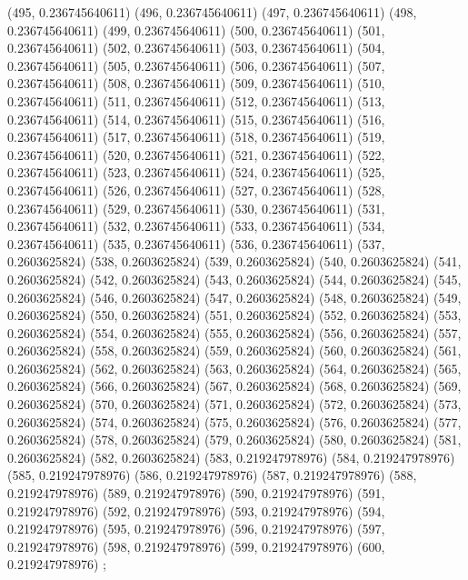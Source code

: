 {					(495, 0.236745640611)
					(496, 0.236745640611)
					(497, 0.236745640611)
					(498, 0.236745640611)
					(499, 0.236745640611)
					(500, 0.236745640611)
					(501, 0.236745640611)
					(502, 0.236745640611)
					(503, 0.236745640611)
					(504, 0.236745640611)
					(505, 0.236745640611)
					(506, 0.236745640611)
					(507, 0.236745640611)
					(508, 0.236745640611)
					(509, 0.236745640611)
					(510, 0.236745640611)
					(511, 0.236745640611)
					(512, 0.236745640611)
					(513, 0.236745640611)
					(514, 0.236745640611)
					(515, 0.236745640611)
					(516, 0.236745640611)
					(517, 0.236745640611)
					(518, 0.236745640611)
					(519, 0.236745640611)
					(520, 0.236745640611)
					(521, 0.236745640611)
					(522, 0.236745640611)
					(523, 0.236745640611)
					(524, 0.236745640611)
					(525, 0.236745640611)
					(526, 0.236745640611)
					(527, 0.236745640611)
					(528, 0.236745640611)
					(529, 0.236745640611)
					(530, 0.236745640611)
					(531, 0.236745640611)
					(532, 0.236745640611)
					(533, 0.236745640611)
					(534, 0.236745640611)
					(535, 0.236745640611)
					(536, 0.236745640611)
					(537, 0.2603625824)
					(538, 0.2603625824)
					(539, 0.2603625824)
					(540, 0.2603625824)
					(541, 0.2603625824)
					(542, 0.2603625824)
					(543, 0.2603625824)
					(544, 0.2603625824)
					(545, 0.2603625824)
					(546, 0.2603625824)
					(547, 0.2603625824)
					(548, 0.2603625824)
					(549, 0.2603625824)
					(550, 0.2603625824)
					(551, 0.2603625824)
					(552, 0.2603625824)
					(553, 0.2603625824)
					(554, 0.2603625824)
					(555, 0.2603625824)
					(556, 0.2603625824)
					(557, 0.2603625824)
					(558, 0.2603625824)
					(559, 0.2603625824)
					(560, 0.2603625824)
					(561, 0.2603625824)
					(562, 0.2603625824)
					(563, 0.2603625824)
					(564, 0.2603625824)
					(565, 0.2603625824)
					(566, 0.2603625824)
					(567, 0.2603625824)
					(568, 0.2603625824)
					(569, 0.2603625824)
					(570, 0.2603625824)
					(571, 0.2603625824)
					(572, 0.2603625824)
					(573, 0.2603625824)
					(574, 0.2603625824)
					(575, 0.2603625824)
					(576, 0.2603625824)
					(577, 0.2603625824)
					(578, 0.2603625824)
					(579, 0.2603625824)
					(580, 0.2603625824)
					(581, 0.2603625824)
					(582, 0.2603625824)
					(583, 0.219247978976)
					(584, 0.219247978976)
					(585, 0.219247978976)
					(586, 0.219247978976)
					(587, 0.219247978976)
					(588, 0.219247978976)
					(589, 0.219247978976)
					(590, 0.219247978976)
					(591, 0.219247978976)
					(592, 0.219247978976)
					(593, 0.219247978976)
					(594, 0.219247978976)
					(595, 0.219247978976)
					(596, 0.219247978976)
					(597, 0.219247978976)
					(598, 0.219247978976)
					(599, 0.219247978976)
					(600, 0.219247978976)
				};
